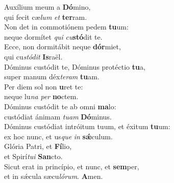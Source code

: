 \evenverse Auxílium meum a \textbf{Dó}mino,~\*\\
\evenverse qui fecit cæ\textit{lum} \textit{et} \textbf{ter}ram.\\
\oddverse Non det in commotiónem pedem \textbf{tu}um:~\*\\
\oddverse neque dormítet \textit{qui} \textit{cu}\textbf{stó}dit te.\\
\evenverse Ecce, non dormitábit neque \textbf{dór}miet,~\*\\
\evenverse qui cu\textit{stó}\textit{dit} \textbf{Is}raël.\\
\oddverse Dóminus custódit te, Dóminus protéctio \textbf{tu}a,~\*\\
\oddverse super manum déx\textit{te}\textit{ram} \textbf{tu}am.\\
\evenverse Per diem sol non \textbf{u}ret te:~\*\\
\evenverse neque lu\textit{na} \textit{per} \textbf{no}ctem.\\
\oddverse Dóminus custódit te ab omni \textbf{ma}lo:~\*\\
\oddverse custódiat ánimam \textit{tu}\textit{am} \textbf{Dó}minus.\\
\evenverse Dóminus custódiat intróitum tuum, et éxitum \textbf{tu}um:~\*\\
\evenverse ex hoc nunc, et us\textit{que} \textit{in} \textbf{sǽ}culum.\\
\oddverse Glória Patri, et \textbf{Fí}lio,~\*\\
\oddverse et Spirí\textit{tu}\textit{i} \textbf{San}cto.\\
\evenverse Sicut erat in princípio, et nunc, et \textbf{sem}per,~\*\\
\evenverse et in sǽcula sæcu\textit{ló}\textit{rum}. \textbf{A}men.\\
